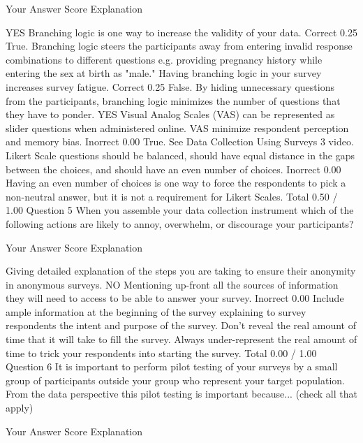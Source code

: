 Your Answer		Score	Explanation

YES Branching logic is one way to increase the validity of your data.	Correct	0.25	True. Branching logic steers the participants away from entering invalid response combinations to different questions e.g. providing pregnancy history while entering the sex at birth as "male."
Having branching logic in your survey increases survey fatigue.	Correct	0.25	False. By hiding unnecessary questions from the participants, branching logic minimizes the number of questions that they have to ponder.
YES Visual Analog Scales (VAS) can be represented as slider questions when administered online. VAS minimize respondent perception and memory bias.	Inorrect	0.00	True. See Data Collection Using Surveys 3 video.
Likert Scale questions should be balanced, should have equal distance in the gaps between the choices, and should have an even number of choices.	Inorrect	0.00	Having an even number of choices is one way to force the respondents to pick a non-neutral answer, but it is not a requirement for Likert Scales.
Total		0.50 / 1.00	
Question 5
When you assemble your data collection instrument which of the following actions are likely to annoy, overwhelm, or discourage your participants?

Your Answer		Score	Explanation

Giving detailed explanation of the steps you are taking to ensure their anonymity in anonymous surveys.			
NO Mentioning up-front all the sources of information they will need to access to be able to answer your survey.	Inorrect	0.00	
Include ample information at the beginning of the survey explaining to survey respondents the intent and purpose of the survey.			
Don't reveal the real amount of time that it will take to fill the survey. Always under-represent the real amount of time to trick your respondents into starting the survey.			
Total		0.00 / 1.00	
Question 6
It is important to perform pilot testing of your surveys by a small group of participants outside your group who represent your target population. From the data perspective this pilot testing is important because... (check all that apply)

Your Answer		Score	Explanation

